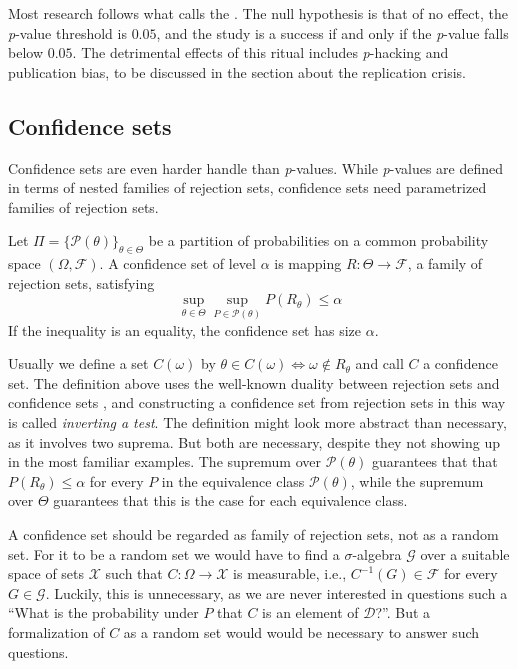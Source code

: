 Most research follows what \textcite{Gigerenzer2004-oc} calls the . The null hypothesis is that of no effect, the \textit{p}-value threshold is $0.05$, and the study is a success if and only if the \textit{p}-value falls below $0.05$. The detrimental effects of this ritual includes \textit{p}-hacking and publication bias, to be discussed in the section about the replication crisis.

\subsection{Confidence sets}
Confidence sets are even harder handle than \textit{p}-values. While
\textit{p}-values are defined in terms of nested families of rejection
sets, confidence sets need parametrized families of rejection sets. 
\begin{definition}
\label{def:confidence sets}Let $\Pi=\{\mathcal{P}(\theta)\}_{\theta\in\Theta}$
be a partition of probabilities on a common probability space $(\Omega,\mathcal{F})$.
A confidence set of level $\alpha$ is mapping $R:\Theta\to\mathcal{F}$,
a family of rejection sets, satisfying 
\begin{equation}
\sup_{\theta\in\Theta}\sup_{P\in\mathcal{P}(\theta)}P(R_{\theta})\leq\alpha\label{eq:confidence set}
\end{equation}
If the inequality is an equality, the confidence set has size $\alpha$. 
\end{definition}

Usually we define a set $C(\omega)$ by $\theta\in C(\omega)\iff\omega\notin R_{\theta}$ and call $C$ a confidence set. The definition above uses the well-known duality between rejection sets and confidence sets \parencite[Section 3.5]{Lehmann2005-sp}, and constructing a confidence set from rejection sets in this way is called
\emph{inverting a test}. The definition might look more abstract than necessary, as it involves two suprema. But both are necessary, despite they not showing up in the most familiar examples. The supremum over $\mathcal{P}(\theta)$ guarantees that that $P(R_{\theta})\leq\alpha$
for every $P$ in the equivalence class $\mathcal{P}(\theta)$, while
the supremum over $\Theta$ guarantees that this is the case for each equivalence class.

A confidence set should be regarded as family of rejection sets, not as a random set. For it to be a random set we would have to find a $\sigma$-algebra $\mathcal{G}$ over a suitable space of sets $\mathcal{X}$ such that $C:\Omega\to\mathcal{X}$ is measurable, i.e., $C^{-1}(G)\in\mathcal{F}$ for every $G\in\mathcal{G}$. Luckily, this is unnecessary, as we are never interested in questions such a ``What is the probability under $P$ that $C$ is an element of $\mathcal{D}$?''. But a formalization of $C$ as a random set would would be necessary to answer such questions.

